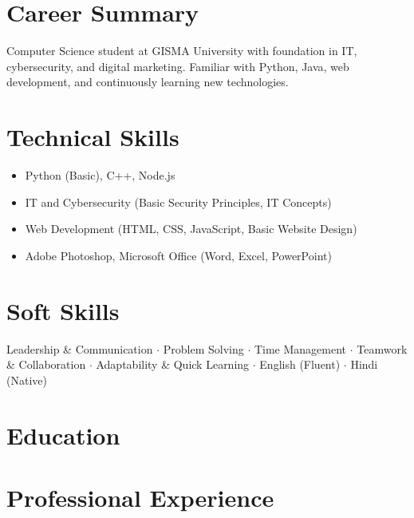 \documentclass[11pt,a4paper,sans]{moderncv}
\begin{document}
\makecvtitle

\section{Career Summary}
Computer Science student at GISMA University with foundation in IT, cybersecurity, and digital marketing. Familiar with Python, Java, web development, and continuously learning new technologies.

\section{Technical Skills}
\begin{itemize}
    \item Python (Basic), C++, Node.js
    \item IT and Cybersecurity (Basic Security Principles, IT Concepts)
    \item Web Development (HTML, CSS, JavaScript, Basic Website Design)
    \item Adobe Photoshop, Microsoft Office (Word, Excel, PowerPoint)
\end{itemize}

\section{Soft Skills}
Leadership \& Communication \quad $\cdot$ \quad Problem Solving \quad $\cdot$ \quad Time Management \quad $\cdot$ \quad Teamwork \& Collaboration \quad $\cdot$ \quad Adaptability \& Quick Learning \quad $\cdot$ \quad English (Fluent) \quad $\cdot$ \quad Hindi (Native)

\section{Education}


\section{Professional Experience}
\end{document}
